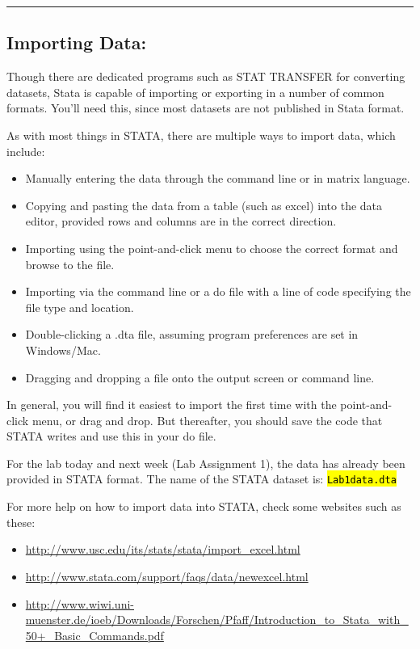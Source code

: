 \documentclass{tufte-handout}
\begin{document}
\bigskip
\hrule
\bigskip

\subsection{Importing Data:}

Though there are dedicated programs such as STAT TRANSFER for converting datasets, Stata is capable of importing or exporting in a number of common formats. You'll need this, since most datasets are not published in Stata format.

As with most things in STATA, there are multiple ways to import data, which include:

\begin{itemize}
\item Manually entering the data through the command line or in matrix language.
\item Copying and pasting the data from a table (such as excel) into the data editor, provided rows and columns are in the correct direction.
\item Importing using the point-and-click menu to choose the correct format and browse to the file.
\item Importing via the command line or a do file with a line of code specifying the file type and location.
\item Double-clicking a .dta file, assuming program preferences are set in Windows/Mac.
\item Dragging and dropping a file onto the output screen or command line.
\end{itemize}

In general, you will find it easiest to import the first time with the point-and-click menu, or drag and drop. But thereafter, you should save the code that STATA writes and use this in your do file.

For the lab today and next week (Lab Assignment 1), the data has already been provided in STATA format. The name of the STATA dataset is: {\tt \hl{Lab1data.dta}}

For more help on how to import data into STATA, check some websites such as these:

\begin{itemize}
\item \url{http://www.usc.edu/its/stats/stata/import_excel.html}
\item \url{http://www.stata.com/support/faqs/data/newexcel.html}
\item \url{http://www.wiwi.uni-muenster.de/ioeb/Downloads/Forschen/Pfaff/Introduction_to_Stata_with_50+_Basic_Commands.pdf}
\end{itemize}
\end{document}
